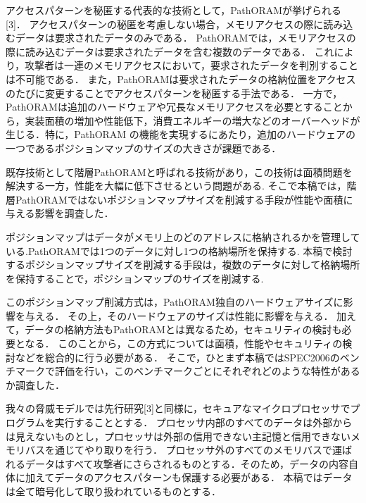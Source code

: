 \documentclass{jarticle}
\begin{document}
アクセスパターンを秘匿する代表的な技術として，PathORAMが挙げられる[3]．
アクセスパターンの秘匿を考慮しない場合，メモリアクセスの際に読み込むデータは要求されたデータのみである．
PathORAMでは，メモリアクセスの際に読み込むデータは要求されたデータを含む複数のデータである．
これにより，攻撃者は一連のメモリアクセスにおいて，要求されたデータを判別することは不可能である．
また，PathORAMは要求されたデータの格納位置をアクセスのたびに変更することでアクセスパターンを秘匿する手法である．
一方で，PathORAMは追加のハードウェアや冗長なメモリアクセスを必要とすることから，実装面積の増加や性能低下，消費エネルギーの増大などのオーバーヘッドが生じる．特に，PathORAM の機能を実現するにあたり，追加のハードウェアの一つであるポジションマップのサイズの大きさが課題である．

既存技術として階層PathORAMと呼ばれる技術があり，この技術は面積問題を解決する一方，性能を大幅に低下させるという問題がある.
そこで本稿では，階層PathORAMではないポジションマップサイズを削減する手段が性能や面積に与える影響を調査した．

ポジションマップはデータがメモリ上のどのアドレスに格納されるかを管理している.PathORAMでは1つのデータに対し1つの格納場所を保持する.
本稿で検討するポジションマップサイズを削減する手段は，複数のデータに対して格納場所を保持することで，ポジションマップのサイズを削減する. 

このポジションマップ削減方式は，PathORAM独自のハードウェアサイズに影響を与える．
その上，そのハードウェアのサイズは性能に影響を与える．
加えて，データの格納方法もPathORAMとは異なるため，セキュリティの検討も必要となる．
このことから，この方式については面積，性能やセキュリティの検討などを総合的に行う必要がある．
そこで，ひとまず本稿ではSPEC2006のベンチマークで評価を行い，このベンチマークごとにそれぞれどのような特性があるか調査した．

我々の脅威モデルでは先行研究[3]と同様に，セキュアなマイクロプロセッサでプログラムを実行することとする．
プロセッサ内部のすべてのデータは外部からは見えないものとし，プロセッサは外部の信用できない主記憶と信用できないメモリバスを通じてやり取りを行う．
プロセッサ外のすべてのメモリバスで運ばれるデータはすべて攻撃者にさらされるものとする．そのため，データの内容自体に加えてデータのアクセスパターンも保護する必要がある．
本稿ではデータは全て暗号化して取り扱われているものとする．
\end{document}
